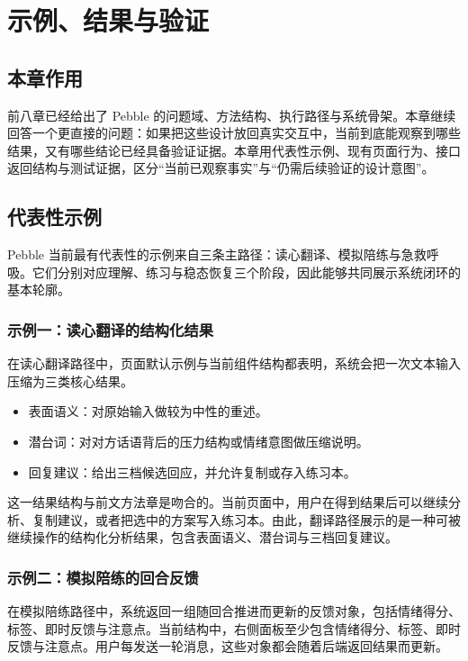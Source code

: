\chapter{示例、结果与验证}

\section{本章作用}

前八章已经给出了 Pebble 的问题域、方法结构、执行路径与系统骨架。本章继续回答一个更直接的问题：如果把这些设计放回真实交互中，当前到底能观察到哪些结果，又有哪些结论已经具备验证证据。本章用代表性示例、现有页面行为、接口返回结构与测试证据，区分“当前已观察事实”与“仍需后续验证的设计意图”。

\section{代表性示例}

Pebble 当前最有代表性的示例来自三条主路径：读心翻译、模拟陪练与急救呼吸。它们分别对应理解、练习与稳态恢复三个阶段，因此能够共同展示系统闭环的基本轮廓。

\subsection{示例一：读心翻译的结构化结果}

在读心翻译路径中，页面默认示例与当前组件结构都表明，系统会把一次文本输入压缩为三类核心结果。

\begin{itemize}
  \item 表面语义：对原始输入做较为中性的重述。
  \item 潜台词：对对方话语背后的压力结构或情绪意图做压缩说明。
  \item 回复建议：给出三档候选回应，并允许复制或存入练习本。
\end{itemize}

这一结果结构与前文方法章是吻合的。当前页面中，用户在得到结果后可以继续分析、复制建议，或者把选中的方案写入练习本。由此，翻译路径展示的是一种可被继续操作的结构化分析结果，包含表面语义、潜台词与三档回复建议。

\subsection{示例二：模拟陪练的回合反馈}

在模拟陪练路径中，系统返回一组随回合推进而更新的反馈对象，包括情绪得分、标签、即时反馈与注意点。当前结构中，右侧面板至少包含情绪得分、标签、即时反馈与注意点。用户每发送一轮消息，这些对象都会随着后端返回结果而更新。

